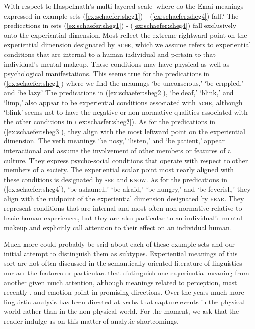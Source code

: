 \documentclass[output=paper,colorlinks,citecolor=brown
]{langscibook}
\begin{document}
With respect to Haspelmath’s multi-layered scale, where do the Emai meanings expressed in example sets (\ref{ex:schaefer:sheg1}) - (\ref{ex:schaefer:sheg4}) fall? The predications in sets (\ref{ex:schaefer:sheg1}) - (\ref{ex:schaefer:sheg4}) fall exclusively onto the experiential dimension. Most reflect the extreme rightward point on the experiential dimension designated by \textsc{ache}, which we assume refers to experiential conditions that are internal to a human individual and pertain to that individual’s mental makeup. These conditions may have physical as well as psychological manifestations. This seems true for the predications in (\ref{ex:schaefer:sheg1}) where we find the meanings ‘be unconscious,’ ‘be crippled,’ and ‘be lazy.’ The predications in (\ref{ex:schaefer:sheg2}), ‘be deaf,’ ‘blink,’ and ‘limp,’ also appear to be experiential conditions associated with \textsc{ache}, although ‘blink’ seems not to have the negative or non-normative qualities associated with the other conditions in (\ref{ex:schaefer:sheg2}). As for the predications in (\ref{ex:schaefer:sheg3}), they align with the most leftward point on the experiential dimension. The verb meanings ‘be nosy,’ ‘listen,’ and ‘be patient,’ appear interactional and assume the involvement of other members or features of a culture. They express psycho-social conditions that operate with respect to other members of a society. The experiential scalar point most nearly aligned with these conditions is designated by \textsc{see} and \textsc{know}. As for the predications in (\ref{ex:schaefer:sheg4}), ‘be ashamed,’ ‘be afraid,’ ‘be hungry,’ and ‘be feverish,’ they align with the midpoint of the experiential dimension designated by \textsc{fear}. They represent conditions that are internal and most often non-normative relative to basic human experiences, but they are also particular to an individual’s mental makeup and explicitly call attention to their effect on an individual human.   

Much more could probably be said about each of these example sets and our initial attempt to distinguish them as subtypes. Experiential meanings of this sort are not often discussed in the semantically oriented literature of linguistics nor are the features or particulars that distinguish one experiential meaning from another given much attention, although meanings related to perception, most recently \citet{NorcliffMajid2024}, and emotion \citep{Lindquist2021} point in promising directions. Over the years much more linguistic analysis has been directed at verbs that capture events in the physical world rather than in the non-physical world. For the moment, we ask that the reader indulge us on this matter of analytic shortcomings. 
\end{document}
